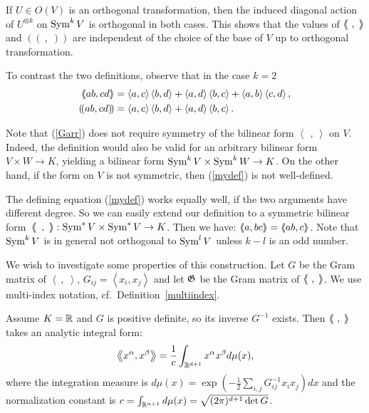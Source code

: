 If $U\in O(V)$ is an orthogonal transformation, then the induced diagonal action of $U^{\otimes k}$ on $\operatorname{Sym}^kV$ is orthogonal in both cases. This shows that the values of $\bra\ ,\;\ket$ and $\left(\!\left(\ ,\;\right)\!\right)$ are independent of the choice of the base of $V$ up to orthogonal transformation. 
\begin{example}
To contrast the two definitions, observe that in the case $k=2$
\begin{align}
\bra ab,cd\ket &= \left<a,c\right>\left<b,d\right>+\left<a,d\right>\left<b,c\right> + \left<a,b\right>\left<c,d\right>, \\
\left(\!\left( ab,cd \right)\!\right) &= \left<a,c\right>\left<b,d\right>+\left<a,d\right>\left<b,c\right>.
\end{align}
\end{example}
\begin{remark}
Note that (\ref{Garr}) does not require symmetry of the bilinear form $\left<\,\ ,\ \right>$ on $V$. Indeed, the definition would also be valid for an arbitrary bilinear form $V\times W \rightarrow K$, yielding a bilinear form $\operatorname{Sym}^kV\times\operatorname{Sym}^kW\rightarrow K$. On the other hand, if the form on $V$ is not symmetric, then (\ref{mydef}) is not well-defined.
\end{remark}
\begin{remark}
The defining equation (\ref{mydef}) works equally well, if the two arguments have different degree. So we can easily extend our definition to a symmetric bilinear form~$\bra\ \,,\ \ket:\Sym^*V\times\Sym^*V \rightarrow K$. Then we have: $\bra a,bc\ket =\bra ab,c\ket$. Note that $\operatorname{Sym}^kV$ is in general not orthogonal to $\operatorname{Sym}^lV$ unless $k-l$ is an odd number.
\end{remark}
We wish to investigate some properties of this construction. Let $G$ be the Gram matrix of $\left< \ ,\;\right>$, \ie $G_{ij} = \left<x_i,x_j\right>$ and
let $\mathfrak{G}$ be the Gram matrix of $\bra\ ,\;\ket$. We use multi-index notation, cf.~Definition~\ref{multiindex}.
\begin{proposition} \label{intequiv}Assume $K=\mathbb{R}$ and $G$ is positive definite, so its inverse $G^{-1} $ exists. Then $\bra\ ,\;\ket$ takes an analytic integral form:
\begin{equation*}
\left<\!\!\!\:\left< x^\alpha, x^\beta \right>\!\!\!\:\right> = \frac{1}{c}\int_{\mathbb{R}^{d+1}} x^\alpha x^\beta d\mu(x),
\end{equation*}
where the integration measure is $d\mu(x) = \exp\left(-\frac{1}{2}\sum_{i,j} G^{-1}_{ij}x_ix_j\right)dx$ and the normalization constant is $c=\int_{\mathbb{R}^{n+1}} d\mu(x)=\sqrt{(2\pi)^{d+1}\det G}$.
\end{proposition}
